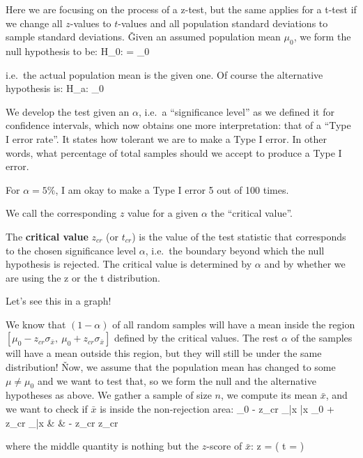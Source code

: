 Here we are focusing on the process of a z-test, but the same applies for a t-test if we change all $z$-values to
$t$-values and all population standard deviations to sample standard deviations. \v

Given an assumed population mean $\mu_{0}$, we form the null hypothesis to be:
\bse
H_{0}: \mu = \mu_{0}
\ese

i.e.\ the actual population mean is the given one. Of course the alternative hypothesis is:
\bse
H_{a}: \mu \neq \mu_{0}
\ese

We develop the test given an $\alpha$, i.e.\ a ``significance level'' as we defined it for confidence intervals,
which now obtains one more interpretation: that of a ``Type I error rate''. It states how tolerant we are to make a
Type I error. In other words, what percentage of total samples should we accept to produce a Type I error.

\be
For $\alpha = 5\%$, I am okay to make a Type I error 5 out of 100 times.
\ee

We call the corresponding $z$ value for a given $\alpha$ the ``critical value''.

The \textbf{critical value} $z_{cr}$ (or $t_{cr}$) is the value of the test statistic that corresponds to the
chosen significance level $\alpha$, i.e.\ the boundary beyond which the null hypothesis is rejected. The critical
value is determined by $\alpha$ and by whether we are using the z or the t distribution.
\ed

Let's see this in a graph!


We know that $(1-\alpha)$ of all random samples will have a mean inside the region $[\mu_{0} - z_{cr} \sigma_{\bar
{x}}, \: \mu_{0} + z_{cr} \sigma_{\bar{x}}]$ defined by the critical values. The rest $\alpha$ of the samples will
have a mean outside this region, but they will still be under the same distribution! \v

Now, we assume that the population mean has changed to some $\mu \neq \mu_{0}$ and we want to test that, so we form
the null and the alternative hypotheses as above. We gather a sample of size $n$, we compute its mean $\bar{x}$,
and we want to check if $\bar{x}$ is inside the non-rejection area:
\mu_{0} - z_{cr} \sigma_{\bar{x}} \: \leq \: \bar{x} \: \leq \: \mu_{0} + z_{cr} \sigma_{\bar{x}}
& \eqv &
- z_{cr} \: \leq \:  \: \leq \: z_{cr}
\ei

where the middle quantity is nothing but the $z$-score of $\bar{x}$:
\bse
z =  \qquad \Big(  \quad
t =  \Big)
\ese

